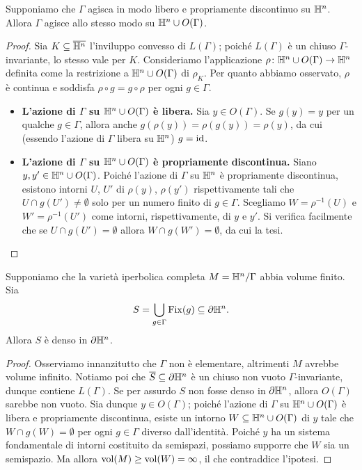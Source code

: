 \begin{proposition*}
Supponiamo che $\Gamma$ agisca in modo libero e propriamente discontinuo su $\mathbb{H}^n$. Allora $\Gamma$ agisce allo stesso modo su $\mathbb{H}^n\cup O(\Gamma)$.
\end{proposition*}
\begin{proof}
Sia $K\subseteq\overline{\mathbb{H}^n}$ l'inviluppo convesso di $L(\Gamma)$; poiché $L(\Gamma)$ è un chiuso $\Gamma$-invariante, lo stesso vale per $K$. Consideriamo l'applicazione $\rho\colon\mathbb{H}^n\cup O(\Gamma)\to\mathbb{H}^n$ definita come la restrizione a $\mathbb{H}^n\cup O(\Gamma)$ di $\rho_K$. Per quanto abbiamo osservato, $\rho$ è continua e soddisfa $\rho\circ g=g\circ\rho$ per ogni $g\in\Gamma$.

\begin{itemize}
\item \textbf{L'azione di $\Gamma$ su $\mathbb{H}^n\cup O(\Gamma)$ è libera.} Sia $y\in O(\Gamma)$. Se $g(y)=y$ per un qualche $g\in\Gamma$, allora anche $g(\rho(y))=\rho(g(y))=\rho(y)$, da cui (essendo l'azione di $\Gamma$ libera su $\mathbb{H}^n$) $g=\operatorname{id}$.
\item \textbf{L'azione di $\Gamma$ su $\mathbb{H}^n\cup O(\Gamma)$ è propriamente discontinua.} Siano $y,y'\in\mathbb{H}^n\cup O(\Gamma)$. Poiché l'azione di $\Gamma$ su $\mathbb{H}^n$ è propriamente discontinua, esistono intorni $U$, $U'$ di $\rho(y)$, $\rho(y')$ rispettivamente tali che $U\cap g(U')\neq\emptyset$ solo per un numero finito di $g\in\Gamma$. Scegliamo $W=\rho^{-1}(U)$ e $W'=\rho^{-1}(U')$ come intorni, rispettivamente, di $y$ e $y'$. Si verifica facilmente che se $U\cap g(U')=\emptyset$ allora $W\cap g(W')=\emptyset$, da cui la tesi.\qedhere
\end{itemize}
\end{proof}

\begin{theorem*}
Supponiamo che la varietà iperbolica completa $M=\mathbb{H}^n/\Gamma$ abbia volume finito. Sia
\[
S=\bigcup_{g\in\Gamma}\operatorname{Fix}(g)\subseteq\partial\mathbb{H}^n.
\]
Allora $S$ è denso in $\partial\mathbb{H}^n$.
\end{theorem*}
\begin{proof}
Osserviamo innanzitutto che $\Gamma$ non è elementare, altrimenti $M$ avrebbe volume infinito. Notiamo poi che $\overline{S}\subseteq\partial\mathbb{H}^n$ è un chiuso non vuoto $\Gamma$-invariante, dunque contiene $L(\Gamma)$. Se per assurdo $S$ non fosse denso in $\partial\mathbb{H}^n$, allora $O(\Gamma)$ sarebbe non vuoto. Sia dunque $y\in O(\Gamma)$; poiché l'azione di $\Gamma$ su $\mathbb{H}^n\cup O(\Gamma)$ è libera e propriamente discontinua, esiste un intorno $W\subseteq\mathbb{H}^n\cup O(\Gamma)$ di $y$ tale che $W\cap g(W)=\emptyset$ per ogni $g\in\Gamma$ diverso dall'identità. Poiché $y$ ha un sistema fondamentale di intorni costituito da semispazi, possiamo supporre che $W$ sia un semispazio. Ma allora $\operatorname{vol}(M)\ge\operatorname{vol}(W)=\infty$, il che contraddice l'ipotesi.
\end{proof}

